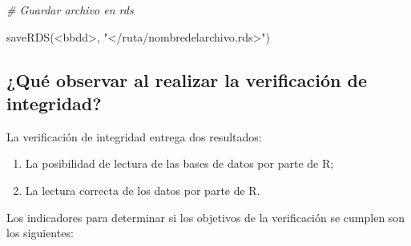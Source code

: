 \documentclass[
  spanish,
]{book}
\newenvironment{Shaded}{\begin{snugshade}}{\end{snugshade}}
\newcommand{\CommentTok}[1]{\textcolor[rgb]{0.56,0.35,0.01}{\textit{#1}}}
\newcommand{\FunctionTok}[1]{\textcolor[rgb]{0.00,0.00,0.00}{#1}}
\newcommand{\NormalTok}[1]{#1}
\newcommand{\SpecialCharTok}[1]{\textcolor[rgb]{0.00,0.00,0.00}{#1}}
\newcommand{\StringTok}[1]{\textcolor[rgb]{0.31,0.60,0.02}{#1}}
\begin{document}
\begin{Shaded}
\begin{Highlighting}[]
\CommentTok{\# Guardar archivo en rds}

\FunctionTok{saveRDS}\NormalTok{(}\SpecialCharTok{\textless{}}\NormalTok{bbdd}\SpecialCharTok{\textgreater{}}\NormalTok{, }\StringTok{"\textless{}/ruta/nombredelarchivo.rds\textgreater{}"}\NormalTok{)}
\end{Highlighting}
\end{Shaded}

\hypertarget{quuxe9-observar-al-realizar-la-verificaciuxf3n-de-integridad}{%
\subsection{¿Qué observar al realizar la verificación de integridad?}\label{quuxe9-observar-al-realizar-la-verificaciuxf3n-de-integridad}}

La verificación de integridad entrega dos resultados:

\begin{enumerate}
\def\labelenumi{\arabic{enumi}.}
\item
  La posibilidad de lectura de las bases de datos por parte de R;
\item
  La lectura correcta de los datos por parte de R.
\end{enumerate}

Los indicadores para determinar si los objetivos de la verificación se cumplen son los siguientes:
\end{document}
